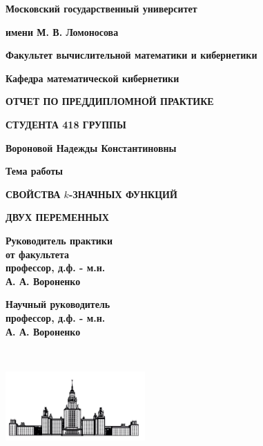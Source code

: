 \documentclass[oneside,final,14pt]{extreport}
\begin{document}

\centerline{ {\bf Московский государственный университет} }
\centerline{{\bf имени М. В. Ломоносова} }

\vspace{\baselineskip}

\centerline{ {\bf Факультет вычислительной математики и кибернетики} }
\centerline{{\bf Кафедра математической кибернетики} }

\vfill
\vfill

\centerline {{\bf ОТЧЕТ ПО ПРЕДДИПЛОМНОЙ ПРАКТИКЕ}}
\centerline {{\bf СТУДЕНТА 418 ГРУППЫ}}

\centerline {{\bf Вороновой Надежды Константиновны}}

\vfill
\vfill

\centerline {{\bf Тема работы}}

\centerline {{\bf СВОЙСТВА \(k\)-ЗНАЧНЫХ ФУНКЦИЙ}}
\centerline {{\bf ДВУХ ПЕРЕМЕННЫХ}}
\normalsize

\vfill
\vfill

\begin{minipage}{0.45\textwidth}
  {\bf Руководитель практики} \\
  {\bf от факультета} \\
  {\bf профессор, д.ф. - м.н.} \\
  {\bf А. А. Вороненко}
\end{minipage}
\hfill
\begin{minipage}{0.4\textwidth}
 {\bf Научный руководитель} \\
 {\bf профессор, д.ф. - м.н.}\\
{\bf А. А. Вороненко }
\end{minipage}


\begin{minipage}{0.45\textwidth}
\hfill             \\
{\bf \underline{ }\underline{ }\underline{ }\underline{ }\underline{ }\underline{ }\underline{ }\underline{ }\underline{ }\underline{ }\underline{ }\underline{ }\underline{ }\underline{ }\underline{ }\underline{ }\underline{ }\underline{ }\underline{ }\underline{ }\underline{ }\underline{ }}
\end{minipage}


\vfill

\centerline {\includegraphics[width=0.4\textwidth]{for_kurs}}
\end{document}
